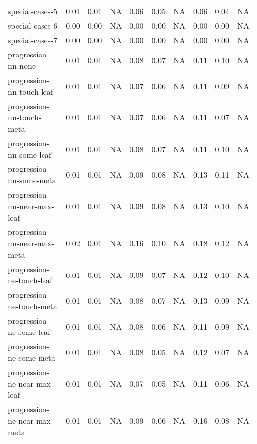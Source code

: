 \begin{tabular}{l|rrr|rrr|rrr}
                special-cases-5 &   0.01 &   0.01 &       NA &    0.06 &   0.05 &       NA &     0.06 &    0.04 &    NA \\
                special-cases-6 &   0.00 &   0.00 &       NA &    0.00 &   0.00 &       NA &     0.00 &    0.00 &    NA \\
                special-cases-7 &   0.00 &   0.00 &       NA &    0.00 &   0.00 &       NA &     0.00 &    0.00 &    NA \\
            progression-nn-none &   0.01 &   0.01 &       NA &    0.08 &   0.07 &       NA &     0.11 &    0.10 &    NA \\
      progression-nn-touch-leaf &   0.01 &   0.01 &       NA &    0.07 &   0.06 &       NA &     0.11 &    0.09 &    NA \\
      progression-nn-touch-meta &   0.01 &   0.01 &       NA &    0.07 &   0.06 &       NA &     0.11 &    0.07 &    NA \\
       progression-nn-some-leaf &   0.01 &   0.01 &       NA &    0.08 &   0.07 &       NA &     0.11 &    0.10 &    NA \\
       progression-nn-some-meta &   0.01 &   0.01 &       NA &    0.09 &   0.08 &       NA &     0.13 &    0.11 &    NA \\
   progression-nn-near-max-leaf &   0.01 &   0.01 &       NA &    0.09 &   0.08 &       NA &     0.13 &    0.10 &    NA \\
   progression-nn-near-max-meta &   0.02 &   0.01 &       NA &    0.16 &   0.10 &       NA &     0.18 &    0.12 &    NA \\
      progression-ne-touch-leaf &   0.01 &   0.01 &       NA &    0.09 &   0.07 &       NA &     0.12 &    0.10 &    NA \\
      progression-ne-touch-meta &   0.01 &   0.01 &       NA &    0.08 &   0.07 &       NA &     0.13 &    0.09 &    NA \\
       progression-ne-some-leaf &   0.01 &   0.01 &       NA &    0.08 &   0.06 &       NA &     0.11 &    0.09 &    NA \\
       progression-ne-some-meta &   0.01 &   0.01 &       NA &    0.08 &   0.05 &       NA &     0.12 &    0.07 &    NA \\
   progression-ne-near-max-leaf &   0.01 &   0.01 &       NA &    0.07 &   0.05 &       NA &     0.11 &    0.06 &    NA \\
   progression-ne-near-max-meta &   0.01 &   0.01 &       NA &    0.09 &   0.06 &       NA &     0.16 &    0.08 &    NA \\

\end{tabular}
